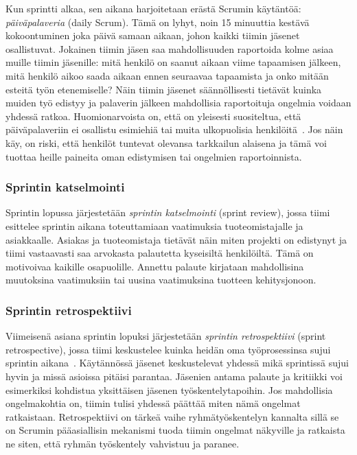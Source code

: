 \documentclass[finnish]{../tktltiki2}
\theoremstyle{definition}
\theoremstyle{remark}
\begin{document}
Kun sprintti alkaa, sen aikana harjoitetaan erästä Scrumin käytäntöä:
\emph{päiväpalaveria} (daily Scrum). Tämä on lyhyt, noin 15 minuuttia kestävä kokoontuminen joka päivä samaan aikaan, johon
kaikki tiimin jäsenet osallistuvat. Jokainen tiimin jäsen saa
mahdollisuuden raportoida kolme asiaa muille tiimin jäsenille:
mitä henkilö on saanut aikaan viime tapaamisen jälkeen, mitä henkilö
aikoo saada aikaan ennen seuraavaa tapaamista ja onko mitään
esteitä työn etenemiselle? Näin tiimin jäsenet säännöllisesti tietävät
kuinka muiden työ edistyy ja palaverin jälkeen mahdollisia raportoituja
ongelmia voidaan yhdessä ratkoa. Huomionarvoista on, että on yleisesti
suositeltua, että päiväpalaveriin ei osallistu esimiehiä tai muita
ulkopuolisia henkilöitä~\cite{ScrumHandBook}. Jos näin käy, on riski,
että henkilöt tuntevat olevansa tarkkailun alaisena ja tämä voi
tuottaa heille paineita oman edistymisen tai ongelmien raportoinnista.

\subsubsection{Sprintin katselmointi}

Sprintin lopussa järjestetään \emph{sprintin katselmointi} (sprint review), jossa tiimi esittelee sprintin aikana toteuttamiaan
vaatimuksia tuoteomistajalle ja asiakkaalle. Asiakas ja tuoteomistaja
tietävät näin miten projekti on edistynyt ja tiimi vastaavasti saa
arvokasta palautetta kyseisiltä henkilöiltä. Tämä on motivoivaa
kaikille osapuolille. Annettu palaute kirjataan mahdollisina muutoksina
vaatimuksiin tai uusina vaatimuksina tuotteen kehitysjonoon.

\subsubsection{Sprintin retrospektiivi}

Viimeisenä asiana sprintin lopuksi järjestetään \emph{sprintin retrospektiivi}
(sprint retrospective), jossa tiimi keskustelee kuinka heidän
oma työprosessinsa sujui sprintin aikana~\cite{Scrumprimer}. Käytännössä jäsenet
keskustelevat yhdessä mikä sprintissä sujui hyvin ja missä
asioissa pitäisi parantaa. Jäsenien antama palaute ja kritiikki
voi esimerkiksi kohdistua yksittäisen jäsenen työskentelytapoihin.
Jos mahdollisia ongelmakohtia on, tiimin tulisi yhdessä päättää
miten nämä ongelmat ratkaistaan. Retrospektiivi on tärkeä vaihe
ryhmätyöskentelyn kannalta sillä se on Scrumin pääasiallisin
mekanismi tuoda tiimin ongelmat näkyville ja ratkaista ne siten,
että ryhmän työskentely vahvistuu ja paranee.\\
\end{document}

